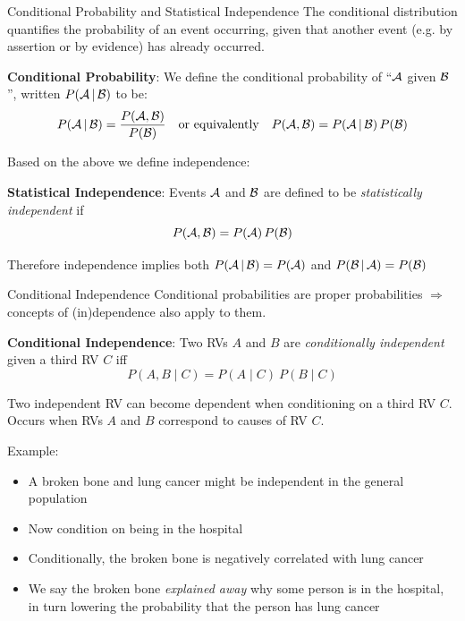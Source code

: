 {    \begin{frame}{Conditional Probability and Statistical  Independence}
        The conditional distribution quantifies the probability of an event occurring,
        given that another event (e.g. by assertion or by evidence) has already occurred.

        \begin{boxed}
            \textbf{Conditional Probability}:
            We define the conditional probability of ``$\mathcal{A}$ given $\mathcal{B}$'', written $P(\mathcal{A} \,|\, \mathcal{B})$ to be:
            $$P(\mathcal{A} \,|\, \mathcal{B}) = \frac{P(\mathcal{A}, \mathcal{B})}{P(\mathcal{B})}
                \quad \text{or equivalently} \quad
                P(\mathcal{A}, \mathcal{B}) = P(\mathcal{A} \,|\, \mathcal{B}) \, P(\mathcal{B})$$
        \end{boxed}

        Based on the above we define independence:

        \begin{boxed}
            \textbf{Statistical Independence}:
            Events $\mathcal{A}$ and $\mathcal{B}$ are defined to be \emph{statistically independent} if
            $$P(\mathcal{A}, \mathcal{B}) = P(\mathcal{A}) \, P(\mathcal{B})$$
        \end{boxed}

        Therefore independence implies both $P(\mathcal{A} \,|\, \mathcal{B}) = P(\mathcal{A})$ and $P(\mathcal{B} \,|\, \mathcal{A}) = P(\mathcal{B})$
    \end{frame}

    \begin{frame}{Conditional Independence}
        Conditional probabilities are proper probabilities $\Rightarrow$ concepts of (in)dependence also apply to them.

        \begin{boxed}
            \textbf{Conditional Independence}:
            Two RVs $A$ and $B$ are \emph{conditionally independent} given a third RV $C$ iff
            $$P(A, B \mid C) = P(A \mid C) \: P(B \mid C)$$
        \end{boxed}

        Two independent RV can become dependent when conditioning on a third RV $C$.
        Occurs when RVs $A$ and $B$ correspond to causes of RV $C$.

        Example:
        \begin{itemize}
            \item A broken bone and lung cancer might be independent in the general population
            \item Now condition on being in the hospital
            \item Conditionally, the broken bone is negatively correlated with lung cancer
            \item We say the broken bone \emph{explained away} why some person is in the hospital,
                  in turn lowering the probability that the person has lung cancer
        \end{itemize}
    \end{frame}


}
